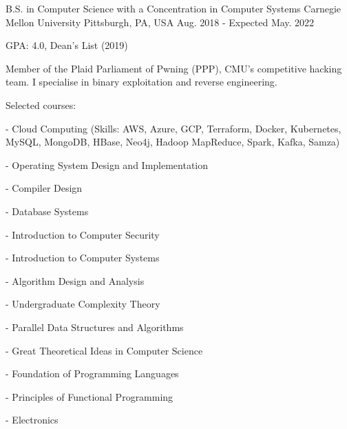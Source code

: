 

\begin{cventries}

  \cventry
    {B.S. in Computer Science with a Concentration in Computer Systems} %
    {Carnegie Mellon University} %
    {Pittsburgh, PA, USA} %
    {Aug. 2018 - Expected May. 2022} %
    {
      \begin{cvitems} %
      \item {GPA: 4.0, Dean's List (2019)}
      \item {Member of the Plaid Parliament of Pwning (PPP), CMU's competitive hacking team. I specialise in binary exploitation and reverse engineering.}
      \item {Selected courses:}
      \item[-] {Cloud Computing (Skills: AWS, Azure, GCP, Terraform, Docker, Kubernetes, MySQL, MongoDB, HBase, Neo4j, Hadoop MapReduce, Spark, Kafka, Samza)}
        \setlength\multicolsep{0pt}
        \begin{multicols}{2}
          \item[-] {Operating System Design and Implementation}
          \item[-] {Compiler Design}
	  \item[-] {Database Systems}
          \item[-] {Introduction to Computer Security}
          \item[-] {Introduction to Computer Systems}
          \item[-] {Algorithm Design and Analysis}
	  \item[-] {Undergraduate Complexity Theory}
          \item[-] {Parallel Data Structures and Algorithms}
          \item[-] {Great Theoretical Ideas in Computer Science}
	  \item[-] {Foundation of Programming Languages}
          \item[-] {Principles of Functional Programming}
          \item[-] {Electronics}

\end{multicols}
\end{cvitems}}
\end{cventries}
